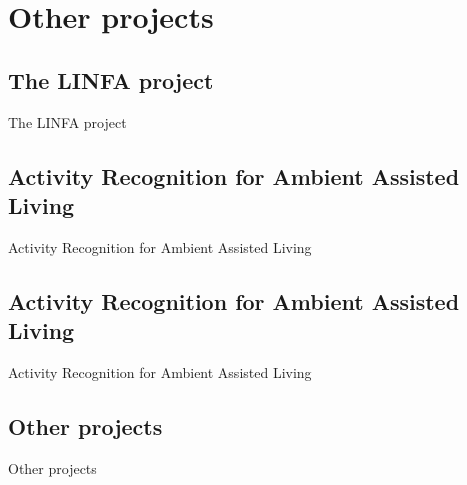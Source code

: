 
\section{Other projects}
  \subsection{The LINFA project}
    \begin{frame}{The LINFA project}
      
    \end{frame}
    
  \subsection{Activity Recognition for Ambient Assisted Living}
    \begin{frame}{Activity Recognition for Ambient Assisted Living}
      
    \end{frame}
    
  \subsection{Activity Recognition for Ambient Assisted Living}
    \begin{frame}{Activity Recognition for Ambient Assisted Living}
      
    \end{frame}
    
  \subsection{Other projects}
    \begin{frame}{Other projects}
      
    \end{frame}
    